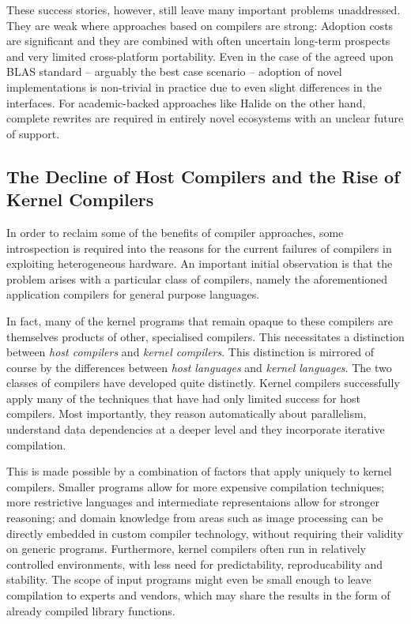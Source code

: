     These success stories, however, still leave many important problems
    unaddressed.
    They are weak where approaches based on compilers are strong:
    Adoption costs are significant and they are combined with often uncertain
    long-term prospects and very limited cross-platform portability.
    Even in the case of the agreed upon BLAS standard -- arguably the best case
    scenario -- adoption of novel implementations is non-trivial in practice due
    to even slight differences in the interfaces.
    For academic-backed approaches like Halide on the other hand, complete
    rewrites are required in entirely novel ecosystems with an unclear future of
    support.

    \subsection*{The Decline of Host Compilers and the Rise of Kernel Compilers}

    In order to reclaim some of the benefits of compiler approaches,
    some introspection is required into the reasons for the current failures of
    compilers in exploiting heterogeneous hardware.
    An important initial observation is that the problem arises with a
    particular class of compilers, namely the aforementioned application
    compilers for general purpose languages.

    In fact, many of the kernel programs that remain opaque to these compilers
    are themselves products of other, specialised compilers.
    This necessitates a distinction between {\em host compilers} and {\em kernel
    compilers}.
    This distinction is mirrored of course by the differences between {\em host
    languages} and {\em kernel languages}.
    The two classes of compilers have developed quite distinctly.
    Kernel compilers successfully apply many of the techniques that have had
    only limited success for host compilers.
    Most importantly, they reason automatically about parallelism, understand
    data dependencies at a deeper level and they incorporate iterative
    compilation.

    This is made possible by a combination of factors that apply uniquely to
    kernel compilers.
    Smaller programs allow for more expensive compilation techniques;
    more restrictive languages and intermediate representaions allow for
    stronger reasoning;
    and domain knowledge from areas such as image processing can be directly
    embedded in custom compiler technology, without requiring their validity
    on generic programs.
    Furthermore, kernel compilers often run in relatively controlled
    environments, with less need for predictability, reproducability and
    stability.
    The scope of input programs might even be small enough to leave compilation
    to experts and vendors, which may share the results in the form of already
    compiled library functions.

